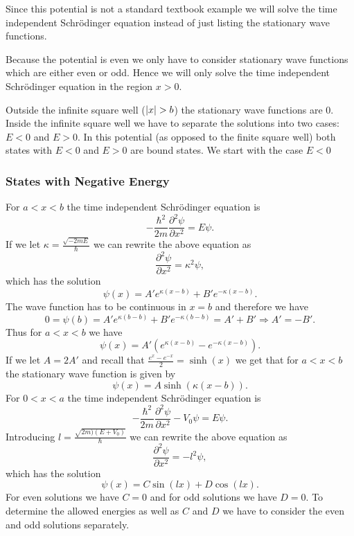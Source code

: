 \documentclass[12pt,a4paper]{article}
\DeclarePairedDelimiter{\abs}{\lvert}{\rvert}
\newcommand{\pdiffn}[3]{\frac{\partial^{#3} #1}{\partial #2^{#3}}}
\begin{document}
Since this potential is not a standard textbook example we will solve the time independent Schrödinger equation instead of just listing the stationary wave functions.

Because the potential is even we only have to consider stationary wave functions which are either even or odd. Hence we will only solve the time independent Schrödinger equation in the region $x > 0$.

Outside the infinite square well ($\abs{x} > b$) the stationary wave functions are $0$. Inside the infinite square well we have to separate the solutions into two cases: $E < 0$ and $E > 0$. In this potential (as opposed to the finite square well) both states with $E < 0$ and $E > 0$ are bound states. We start with the case $E < 0$

\subsubsection{States with Negative Energy}
For $a < x < b$ the time independent Schrödinger equation is
\begin{equation}
- \frac{\hbar^2}{2 m} \pdiffn{\psi}{x}{2} = E \psi.
\end{equation}
If we let $\kappa = \frac{\sqrt{- 2 m E}}{\hbar}$ we can rewrite the above equation as
\begin{equation}
\pdiffn{\psi}{x}{2} = \kappa^2 \psi,
\end{equation}
which has the solution
\begin{equation}
\psi(x) = A' e^{\kappa (x - b)} + B' e^{- \kappa (x - b)}.
\end{equation}
The wave function has to be continuous in $x = b$ and therefore we have
\begin{equation}
0 = \psi(b) =  A' e^{\kappa (b - b)} + B' e^{- \kappa (b - b)} = A' + B' \Rightarrow A' = - B'.
\end{equation}
Thus for $a < x < b$ we have
\begin{equation}
\psi(x) = A' \left(e^{\kappa (x - b)} - e^{- \kappa (x - b)} \right).
\end{equation}
If we let $A = 2 A'$ and recall that $\frac{e^x - e^{-x}}{2} = \sinh(x)$ we get that for $a < x < b$ the stationary wave function is given by
\begin{equation}
\psi(x) = A \sinh \left(\kappa (x - b) \right).
\end{equation}
For $0 < x < a$ the time independent Schrödinger equation is
\begin{equation}
- \frac{\hbar^2}{2 m} \pdiffn{\psi}{x}{2} - V_0 \psi = E \psi.
\end{equation}
Introducing $l = \frac{\sqrt{2 m )(E + V_0)}}{\hbar}$ we can rewrite the above equation as
\begin{equation}
\pdiffn{\psi}{x}{2} = -l^2 \psi,
\end{equation}
which has the solution
\begin{equation}
\psi(x) = C \sin(l x) + D \cos(l x).
\end{equation}
For even solutions we have $C = 0$ and for odd solutions we have $D = 0$. To determine the allowed energies as well as $C$ and $D$ we have to consider the even and odd solutions separately.
\end{document}
